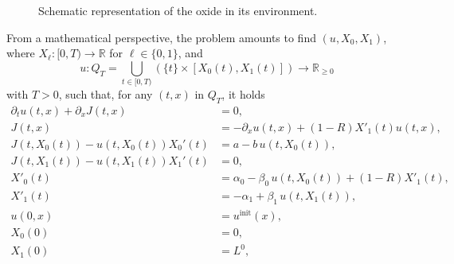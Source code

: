 \documentclass{amsart}
\def\colmet{gray!30!white}
\def\colox{orange!40!white}
\def\colsol{blue!20!white}
\newcommand\R{\mathbb{R}}
\renewcommand\d[1]{\partial_{#1}}
\begin{document}
\begin{figure}[htb]
\centering
{}
\caption{Schematic representation of the oxide in its environment.}\label{fig:geometry}
\end{figure}

From a mathematical perspective, the problem amounts to find $(u, X_0, X_1)$, where $X_\ell : [0,T) \rightarrow \R$ for $\ell \in \{0,1\}$, and
\[
u: Q_T = \bigcup_{t \in [0,T)} \left( \{t\} \times [X_0(t), X_1(t)] \right)  \to \R_{\geq 0}
\]
with $T>0$, 
such that, for any $(t,x)$ in $Q_T$, it holds
\begin{subequations} \label{eq:sys_mov}
\begin{align}
\d{t} u(t,x) + \d{x} J(t,x) & = 0,\label{eq:u} \\
J(t,x) &= - \d{x} u(t,x) + (1-R) X'_1(t) u(t,x),  \label{eq:def_J}\\
J(t, X_0(t)) - u(t, X_0(t))X_0'(t)  & = a - b\, u(t,X_0(t)),  \label{eq:flux_bord0}\\
J(t, X_1(t)) - u(t, X_1(t))X_1'(t) &= 0, \label{eq:flux_bord1}\\
X'_0(t) &= \alpha_0 - \beta_0\, u(t,X_0(t)) + (1-R) X'_1(t), \label{eq:X0_cont}\\
X'_1(t) & = - \alpha_1 + \beta_1\, u(t,X_1(t)), \label{eq:X1_cont}\\
u(0,x) & = u^\text{init}(x), \label{eq:CI} \\
X_0(0) & = 0, \label{eq:CI.X0} \\
X_1(0) & = L^0, \label{eq:CI.X1} 
\end{align}
\end{subequations}
\end{document}
